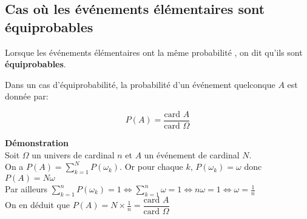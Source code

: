 \subsection*{Cas où les événements élémentaires sont équiprobables }
\begin{definition}
Lorsque les événements élémentaires ont la même probabilité , on dit qu’ils sont \textbf{ équiprobables}.
\end{definition}
\begin{property}
Dans un cas d’équiprobabilité, la probabilité d’un événement quelconque  $A$ est donnée par:

$$ P(A)=\dfrac{\text{card }A}{\text{card } \Omega}$$
\end{property}
\textbf{Démonstration}\\
Soit $ \Omega $ un univers  de cardinal $ n$
et  $ A $ un événement de cardinal $ N. $\\
On a $ P(A)= \displaystyle\sum_{k=1}^N P(\omega_{k})$. Or pour chaque $ k $,  $ P (\omega_{k})=\omega $  donc $ P(A)=N \omega $\\
Par ailleurs $ \displaystyle \sum_{k=1}^n P(\omega_{k})=1  \Longleftrightarrow  \sum_{k=1}^n  \omega=1  \Longleftrightarrow n \omega =1 \Longleftrightarrow \omega =\frac{1}{n}$\\ On en déduit que $ P(A)=N\times   \frac{1}{n}= \dfrac{\text{card }A}{\text{card } \Omega}$

